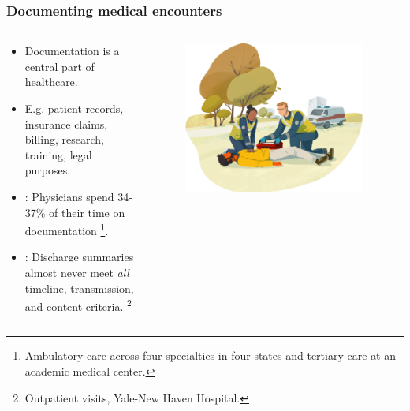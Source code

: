 \begin{frame}
    \frametitle{Documenting medical encounters}
    \begin{columns}
        \begin{column}{0.5\textwidth}
            \begin{itemize}
                \item <1-> Documentation is a central part of healthcare.
                \item <1-> E.g. patient records, insurance claims, billing, research, training, legal purposes.
                \vspace{1em}
                \item <2-> : Physicians spend 34-37\% of their time on documentation \cite{joukes_time_2018, tipping_where_2010, sinsky_allocation_2016}\footnote<2->{Ambulatory care across four specialties in four states and tertiary care at an academic medical center.}.
                \item <2-> : Discharge summaries almost never meet \emph{all} timeline, transmission, and content criteria. \cite{horwitz_comprehensive_2013}\footnote<2->{Outpatient visits, Yale-New Haven Hospital.}
            \end{itemize}
        \end{column}
        \begin{column}{0.5\textwidth}
            \begin{figure}
                \centering
                \includegraphics[width=0.95\textwidth]{figures/corti_sketch_responders.png}
            \end{figure}
        \end{column}
    \end{columns}

\end{frame}


